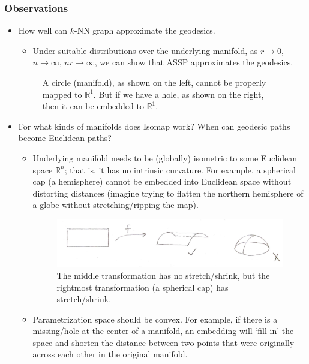 \subsubsection*{Observations}
\begin{itemize}
\item How well can $k$-NN graph approximate the geodesics.
  \begin{itemize}
  \item Under suitable distributions over the underlying    manifold,
    as $r\rightarrow 0$, $n\rightarrow \infty$, $nr \rightarrow
    \infty$, we can show that ASSP approximates the geodesics. 
  \end{itemize}
 
\begin{figure}
\centering
{}
\caption{A circle (manifold), as shown on the left, cannot be properly mapped to $\mathbb{R}^{1}$. But if we have a hole, as shown on the right, then it can be embedded to $\mathbb{R}^{1}$. } \label{fig:M1}
\end{figure}
 
\item For what kinds of manifolds does Isomap work? When can geodesic paths become Euclidean paths?
  \begin{itemize}
  \item Underlying manifold needs to be (globally) isometric to some Euclidean space 
    $\mathbb{R}^n$; that is, it has no intrinsic curvature. For
    example, a spherical cap (a hemisphere) cannot be embedded into
    Euclidean space without distorting distances (imagine trying to
    flatten the northern hemisphere of a globe without
    stretching/ripping the map).  
    
\begin{figure}
\centering
\includegraphics[width=1.0\textwidth]{chapter_7/files/isometric.jpeg}
\caption{The middle transformation has no stretch/shrink, but the rightmost transformation (a spherical cap) has stretch/shrink. }
\end{figure}
    
  \item Parametrization space should be convex. For example, if there
    is a missing/hole at the center of a manifold, an embedding will
    `fill in' the space and shorten the distance between two points
    that were originally across each other in the original manifold. 
  \end{itemize}

\end{itemize}

